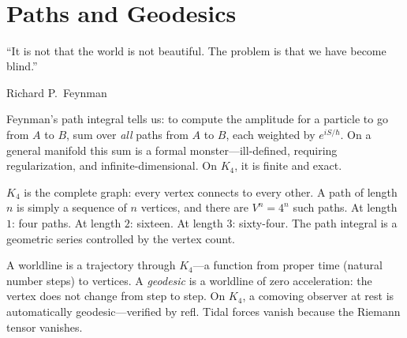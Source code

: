 \documentclass[11pt,a4paper]{book}
\def\texttt#1{#1}%
\begin{document}
\begin{code}
%
\\[\AgdaEmptyExtraSkip]%
\>[0]\AgdaSpace{}%
\AgdaSymbol{:}\AgdaSpace{}%
\<%
\\
\>[0]\AgdaSpace{}%
\AgdaSymbol{=}\AgdaSpace{}%
\<%
\\
\>[0][@{}l@{\AgdaIndent{0}}]%
\>[2]\AgdaSymbol{\{}\AgdaSpace{}%
%
\>[23]\AgdaSymbol{=}\AgdaSpace{}%
\<%
\\
%
\>[2]\AgdaSymbol{;}\AgdaSpace{}%
%
\>[22]\AgdaSymbol{=}\AgdaSpace{}%
\<%
\\
%
\>[2]\AgdaSymbol{;}\AgdaSpace{}%
%
\>[22]\AgdaSymbol{=}\AgdaSpace{}%
\<%
\\
%
\>[2]\AgdaSymbol{;}\AgdaSpace{}%
\AgdaSpace{}%
\AgdaSymbol{=}\AgdaSpace{}%
\AgdaSpace{}%
\AgdaSymbol{\}}\<%
\end{code}

\chapter{Paths and Geodesics}
\label{ch:paths-geodesics}

\epigraph{``It is not that the world is not beautiful. The problem is that we have become blind.''}{Richard P.~Feynman}

Feynman's path integral tells us: to compute the amplitude for a particle to go from $A$ to $B$, sum over \emph{all} paths from $A$ to $B$, each weighted by $e^{iS/\hbar}$. On a general manifold this sum is a formal monster---ill-defined, requiring regularization, and infinite-dimensional. On $K_4$, it is finite and exact.

$K_4$ is the complete graph: every vertex connects to every other. A path of length $n$ is simply a sequence of $n$ vertices, and there are $V^n = 4^n$ such paths. At length $1$: four paths. At length $2$: sixteen. At length $3$: sixty-four. The path integral is a geometric series controlled by the vertex count.

A worldline is a trajectory through $K_4$---a function from proper time (natural number steps) to vertices. A \emph{geodesic} is a worldline of zero acceleration: the vertex does not change from step to step. On $K_4$, a comoving observer at rest is automatically geodesic---verified by \texttt{refl}. Tidal forces vanish because the Riemann tensor vanishes.
\end{document}
